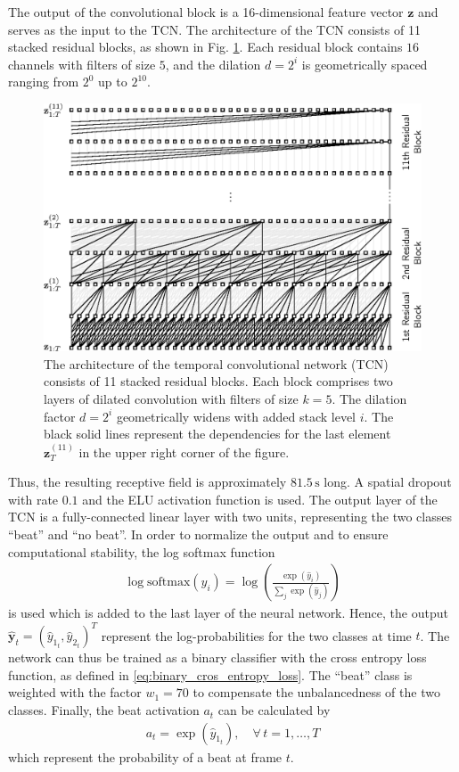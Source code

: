\documentclass{scrartcl}
\begin{document}
The output of the convolutional block is a 16-dimensional feature vector $\mathbf z$ and serves as the input to the TCN. The architecture of the TCN consists of 11 stacked residual blocks, as shown in Fig. \ref{fig:tcn}. Each residual block contains $16$ channels with filters of size $5$, and the dilation $d=2^i$ is geometrically spaced ranging from $2^0$ up to $2^{10}$. 
\begin{figure}[htbp]
\centering
\includegraphics[scale=1.0]{figures/tcn.eps}
\caption{The architecture of the temporal convolutional network (TCN) consists of 11 stacked residual blocks. Each block comprises two layers of dilated convolution with filters of size $k=5$. The dilation factor $d=2^i$ geometrically widens with added stack level $i$. The black solid lines represent the dependencies for the last element $\mathbf z_T^{(11)}$ in the upper right corner of the figure.}
\label{fig:tcn}
\end{figure}    
Thus, the resulting receptive field is approximately $81.5\,\text{s}$ long. A spatial dropout with rate $0.1$ and the ELU activation function is used. The output layer of the TCN is a fully-connected linear layer with two units, representing the two classes ``beat'' and ``no beat''. In order to normalize the output and to ensure computational stability, the log softmax function 
\begin{align}
\log \text{softmax}(\hat{y}_i) = \log\left(\frac{\exp{(\hat{y}_i)}}{\sum_j \exp(\hat{y}_j)}\right)
\end{align} 
is used which is added to the last layer of the neural network. Hence, the output $\hat{\mathbf y}_t = (\hat{y}_{1_t}, \hat{y}_{2_t})^T$ represent the log-probabilities for the two classes at time $t$. The network can thus be trained as a binary classifier with the cross entropy loss function, as defined in \eqref{eq:binary_cros_entropy_loss}. The ``beat'' class is weighted with the factor $w_1=70$ to compensate the unbalancedness of the two classes. Finally, the beat activation $a_t$ can be calculated by
\begin{align}
a_t = \exp \left({\hat{y}_{1_t}} \right), \quad \forall \, t= 1,\dots,T
\end{align}  
which represent the probability of a beat at frame $t$.
\end{document}
